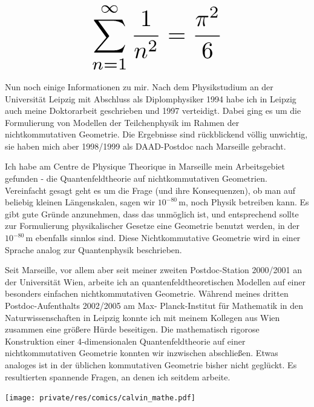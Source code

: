 \begin{multicols}{2}
\[
\resizebox{0.45\hsize}{!}{$\displaystyle\sum_{n = 1}^\infty \frac{1}{n^2} = \frac{\pi^2}{6}$}
\]

Nun noch einige Informationen zu mir. Nach dem Physikstudium an der Universität Leipzig mit Abschluss als Diplomphysiker 1994 habe ich in Leipzig auch meine Doktorarbeit geschrieben und 1997 verteidigt. Dabei ging es um die Formulierung von Modellen der Teilchenphysik im Rahmen der nichtkommutativen Geometrie. Die Ergebnisse sind rückblickend völlig unwichtig, sie haben mich aber 1998/1999 als DAAD-Postdoc nach Marseille gebracht.

Ich habe am Centre de Physique Theorique in Marseille mein Arbeitsgebiet gefunden - die Quantenfeldtheorie auf nichtkommutativen Geometrien. Vereinfacht gesagt geht es um die Frage (und ihre Konsequenzen), ob man auf beliebig kleinen Längenskalen, sagen wir $10^{-80}$\,m, noch Physik betreiben kann. Es gibt gute Gründe anzunehmen, dass das unmöglich ist, und entsprechend sollte zur Formulierung physikalischer Gesetze eine Geometrie benutzt werden, in der $10^{-80}$\,m ebenfalls sinnlos sind. Diese Nichtkommutative Geometrie wird in einer Sprache analog zur Quantenphysik beschrieben.

Seit Marseille, vor allem aber seit meiner zweiten Postdoc-Station 2000/2001 an der Universität Wien, arbeite ich an quantenfeldtheoretischen Modellen auf einer besonders einfachen nichtkommutativen Geometrie. Während meines dritten Postdoc-Aufenthalts 2002/2005 am Max- Planck-Institut für Mathematik in den Naturwissenschaften in Leipzig konnte ich mit meinem Kollegen aus Wien zusammen eine größere Hürde beseitigen. Die mathematisch rigorose Konstruktion einer 4-dimensionalen Quantenfeldtheorie auf einer nichtkommutativen Geometrie konnten wir inzwischen abschließen. Etwas analoges ist in der üblichen kommutativen Geometrie bisher nicht geglückt. Es resultierten spannende Fragen, an denen ich seitdem arbeite.

\begin{center}
\texttt{[image: private/res/comics/calvin\_mathe.pdf]}
\end{center}
\end{multicols}
